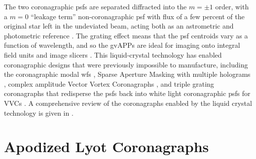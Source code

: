 \documentclass[letterpaper]{ar-1col}
\begin{document}
%
The two coronagraphic \acp{psf} are separated diffracted into the $m=\pm 1$ order, with a $m=0$ ``leakage term'' non-coronagraphic \ac{psf} with flux of a few percent of the original star left in the undeviated beam, acting both as an astrometric and photometric reference \citep{Otten17,Sutlieff24}.
%
The grating effect means that the \ac{psf} centroids vary as a function of wavelength, and so the gvAPPs are ideal for imaging onto integral field units and image slicers \citep{Sutlieff21,Sutlieff23}.
%
This liquid-crystal technology has enabled coronagraphic designs that were previously impossible to manufacture, including the coronagraphic modal \ac{wfs} \citep{Wilby17}, Sparse Aperture Masking with multiple holograms \citep{Doelman21}, complex amplitude Vector Vortex Coronagraphs \citep[VVC; ][]{Snik14}, and triple grating coronagraphs \citep{Doelman20} that redisperse the \acp{psf} back into white light coronagraphic \acp{psf} for VVCs \citep{Doelman23,Laginga24}. 
%
A comprehensive review of the coronagraphs enabled by the liquid crystal technology is given in \citet{Doelman2021a}.

\section{Apodized Lyot Coronagraphs}\label{sec:nulled_lyot}
\end{document}
